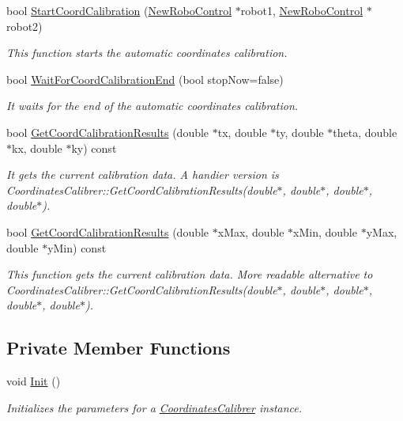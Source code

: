 \begin{DoxyCompactItemize}
bool \hyperlink{classCoordinatesCalibrer_a2087994adbb8651efcb06e3d7a2315da}{StartCoordCalibration} (\hyperlink{classNewRoboControl}{NewRoboControl} $\ast$robot1, \hyperlink{classNewRoboControl}{NewRoboControl} $\ast$robot2)
\begin{DoxyCompactList}\small\item\em This function starts the automatic coordinates calibration. \item\end{DoxyCompactList}\item 
bool \hyperlink{classCoordinatesCalibrer_a99563ba6e43f839bf1b10f55cf155125}{WaitForCoordCalibrationEnd} (bool stopNow=false)
\begin{DoxyCompactList}\small\item\em It waits for the end of the automatic coordinates calibration. \item\end{DoxyCompactList}\item 
bool \hyperlink{classCoordinatesCalibrer_a92672252bda26bddd9b8c73bc6395ea3}{GetCoordCalibrationResults} (double $\ast$tx, double $\ast$ty, double $\ast$theta, double $\ast$kx, double $\ast$ky) const 
\begin{DoxyCompactList}\small\item\em It gets the current calibration data. A handier version is CoordinatesCalibrer::GetCoordCalibrationResults(double$\ast$, double$\ast$, double$\ast$, double$\ast$). \item\end{DoxyCompactList}\item 
bool \hyperlink{classCoordinatesCalibrer_a1a3ae703556c2f4c4455792a43fed987}{GetCoordCalibrationResults} (double $\ast$xMax, double $\ast$xMin, double $\ast$yMax, double $\ast$yMin) const 
\begin{DoxyCompactList}\small\item\em This function gets the current calibration data. More readable alternative to CoordinatesCalibrer::GetCoordCalibrationResults(double$\ast$, double$\ast$, double$\ast$, double$\ast$, double$\ast$). \item\end{DoxyCompactList}\end{DoxyCompactItemize}
\subsection*{Private Member Functions}
\begin{DoxyCompactItemize}
\item 
void \hyperlink{classCoordinatesCalibrer_a19faab9e443f7ef64462a36c19baf6bc}{Init} ()
\begin{DoxyCompactList}\small\item\em Initializes the parameters for a \hyperlink{classCoordinatesCalibrer}{CoordinatesCalibrer} instance. \item\end{DoxyCompactList}\end{DoxyCompactItemize}
